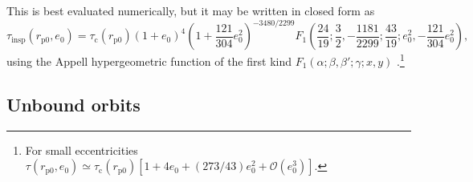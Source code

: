 \documentclass[useAMS,usedcolumn,usegraphicx,usenatbib]{mn2e}
\newcommand{\sub}[1]{\ensuremath{_\mathrm{#1}}}
\newcommand{\order}[1]{\ensuremath{\mathcal{O}({#1})}}
\begin{document}
\begin{onecolumn}
\begin{equation}
\end{equation}
This is best evaluated numerically, but it may be written in closed form as
\begin{equation}
\tau\sub{insp}(r\sub{p0},e_0) = \tau\sub{c}(r\sub{p0})(1 + e_0)^4\left(1 + \frac{121}{304}e_0^2\right)^{-3480/2299} F_1\left(\frac{24}{19};\frac{3}{2},-\frac{1181}{2299};\frac{43}{19};e_0^2,-\frac{121}{304}e_0^2\right),
\label{eq:Bound_inspiral}
\end{equation}
using the Appell hypergeometric function of the first kind $F_1(\alpha;\beta,\beta';\gamma;x,y)$ \citep[16.15.1]{Olver2010}.\footnote{For small eccentricities $\tau(r\sub{p0},e_0) \simeq \tau\sub{c}(r\sub{p0})[1 + 4e_0 + (273/43)e_0^2 + \order{e_0^3}]$.}

\subsection{Unbound orbits}\label{sec:Unbound}


\end{onecolumn}
\end{document}
